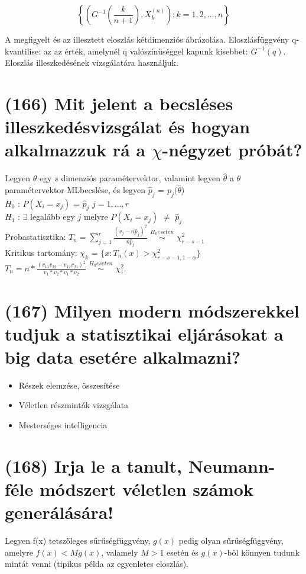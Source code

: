 \documentclass[12p]{article}
\begin{document}
$$\left\{\left(G^{-1}\left(\frac{k}{n+1}\right), X_k^{(n)}\right):k=1,2,...,n\right\}$$

A megfigyelt és az illesztett eloszlás kétdimenziós ábrázolása. Eloszlásfüggvény q-kvantilise: az az érték, amelynél q valószínűséggel kapunk kisebbet: $G^{-1}(q)$.\\
Eloszlás illeszkedésének vizsgálatára használjuk.

\section{(166) Mit jelent a becsléses illeszkedésvizsgálat és hogyan alkalmazzuk rá a $\chi$-négyzet próbát?}

Legyen $\theta$ egy $s$ dimenziós paramétervektor, valamint legyen $\hat{\theta}$ a $\theta$ paramétervektor MLbecslése, és legyen $\hat{p}_j$ = $p_j (\hat{\theta}$)\\
$H_0$ : $P(X_i = x_j)$ = $\hat{p}_j$ $j = 1,. . . , r$\\
$H_1$ : $\exists$ legalább egy $j$ melyre $P(X_i = x_j)$ $\neq$ $\hat{p}_j$\\
Probastatisztika: $T_n = \displaystyle{\sum_{j=1}^{r}}\frac{(v_j - n\hat{p}_j)^2}{n\hat{p}_j}$ $\stackrel{H_0 eseten}{\sim}$ $\chi^2_{r-s-1}$\\
Kritikus tartomány: $\chi_k$ = $\{x: T_n(x) > \chi^2_{r-s-1,1-\alpha}\}$\\
$T_n = n * \frac{(v_{11}v_{22} - v_{12}v_{21})^2}{v_1 * v_2 * v_1 * v_2}$ $\stackrel{H_0 eseten}{\sim}$ $\chi^2_1$.



\section{(167) Milyen modern módszerekkel tudjuk a statisztikai eljárásokat a big data esetére alkalmazni?}

\begin{itemize}
\item Részek elemzése, összesítése
\item Véletlen részminták vizsgálata
\item Mesterséges intelligencia
\end{itemize}


\section{(168) Irja le a tanult, Neumann-féle módszert véletlen számok generálására!}
Legyen f(x) tetszőleges sűrűségfüggvény, $g(x)$ pedig olyan sűrűségfüggvény, amelyre $f(x) < Mg(x)$, valamely $M>1$ esetén és $g(x)$-ből könnyen tudunk mintát venni (tipikus példa az egyenletes eloszlás).
\end{document}
